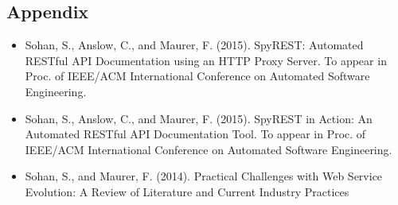\documentclass[11pt,oneside]{book}
\begin{document}
\begin{landscape}
\begin{gantt}{18}{15}
     \begin{ganttitle}
     \end{ganttitle}
   \end{gantt}
\end{landscape}

\backmatter

% 
% 

\begin{appendices}

\chapter{Appendix}

\begin{itemize}

\item Sohan, S., Anslow, C., and Maurer, F. (2015). SpyREST: Automated RESTful API Documentation using an HTTP Proxy Server. To appear in Proc. of IEEE/ACM International Conference on Automated Software Engineering.

\item Sohan, S., Anslow, C., and Maurer, F. (2015). SpyREST in Action: An Automated RESTful API Documentation Tool. To appear in Proc. of IEEE/ACM International Conference on Automated Software Engineering.

\item Sohan, S., and Maurer, F. (2014). Practical Challenges with Web Service Evolution: A Review of Literature and Current Industry Practices
\end{itemize}

\end{appendices}
\end{document}
